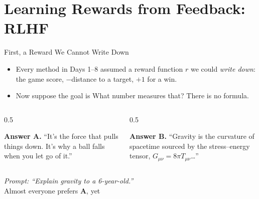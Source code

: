 \section{Learning Rewards from Feedback: RLHF}

\begin{frame}{First, a Reward We Cannot Write Down}
\begin{itemize}\itemsep0.5em
    \item Every method in Days 1--8 assumed a reward function $r$ we could
          \emph{write down}: the game score, $-$distance to a target, $+1$ for a
          win.
    \item Now suppose the goal is  What number measures that? There is no formula.
\end{itemize}
\vspace{0.5em}
\begin{columns}[T]
\begin{column}{0.5\textwidth}\centering
\setlength{\fboxsep}{6pt}%
\colorbox{boxgreen!50}{\parbox{0.92\linewidth}{\footnotesize
\textbf{Answer A.} ``It's the force that pulls things down. It's why a ball
falls when you let go of it.''}}
\end{column}
\begin{column}{0.5\textwidth}\centering
\setlength{\fboxsep}{6pt}%
\colorbox{boxred!40}{\parbox{0.92\linewidth}{\footnotesize
\textbf{Answer B.} ``Gravity is the curvature of spacetime sourced by the
stress--energy tensor, $G_{\mu\nu} = 8\pi T_{\mu\nu}$\dots''}}
\end{column}
\end{columns}
\vspace{0.5em}
\begin{center}\small
\emph{Prompt: ``Explain gravity to a 6-year-old.''}\\
Almost everyone prefers \textbf{A}, yet 
\end{center}
\end{frame}

